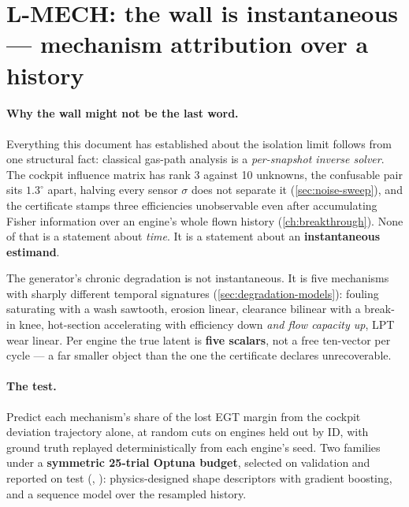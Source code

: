\section{L-MECH: the wall is instantaneous --- mechanism attribution over a history}
\label{sec:f13-mech}

\paragraph{Why the wall might not be the last word.} Everything this document has established
about the isolation limit follows from one structural fact: classical gas-path analysis is a
\emph{per-snapshot inverse solver}. The cockpit influence matrix has rank 3 against 10
unknowns, the confusable pair sits $1.3^{\circ}$ apart, halving every sensor $\sigma$ does not
separate it (\cref{sec:noise-sweep}), and the certificate stamps three efficiencies
unobservable even after accumulating Fisher information over an engine's whole flown history
(\cref{ch:breakthrough}). None of that is a statement about \emph{time}. It is a statement
about an \textbf{instantaneous estimand}.

The generator's chronic degradation is not instantaneous. It is five mechanisms with sharply
different temporal signatures (\cref{sec:degradation-models}): fouling saturating with a wash
sawtooth, erosion linear, clearance bilinear with a break-in knee, hot-section accelerating
with efficiency down \emph{and flow capacity up}, LPT wear linear. Per engine the true latent
is \textbf{five scalars}, not a free ten-vector per cycle --- a far smaller object than the one
the certificate declares unrecoverable.

\paragraph{The test.} Predict each mechanism's share of the lost EGT margin from the cockpit
deviation trajectory alone, at random cuts on engines held out by ID, with ground truth
replayed deterministically from each engine's seed. Two families under a \textbf{symmetric
25-trial Optuna budget}, selected on validation and reported on test
(, ): physics-designed shape
descriptors with gradient boosting, and a sequence model over the resampled history.

